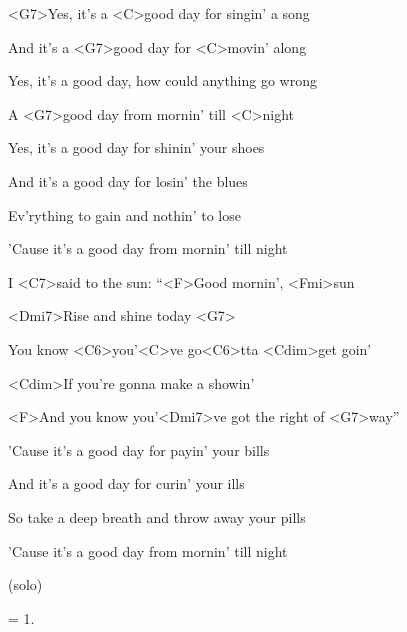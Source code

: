 
\zs
<G7>Yes, it's a <C>good day for singin' a song

And it's a <G7>good day for <C>movin' along 

Yes, it's a good day, how could anything go wrong

A <G7>good day from mornin' till <C>night
\ks

\zs 
Yes, it's a good day for shinin' your shoes 

And it's a good day for losin' the blues 

Ev'rything to gain and nothin' to lose 

'Cause it's a good day from mornin' till night 
\ks

\zr
I <C7>said to the sun: ``<F>Good mornin', <Fmi>sun

<Dmi7>Rise and shine today <G7>

You know <C6>you'<C>ve go<C6>tta <Cdim>get goin' 

<Cdim>If you're gonna make a showin' 

<F>And you know you'<Dmi7>ve got the right of <G7>way''
\kr

\zs
'Cause it's a good day for payin' your bills 

And it's a good day for curin' your ills 

So take a deep breath and throw away your pills 

'Cause it's a good day from mornin' till night 
\ks

(solo)

\zr
\kr

\zs
= 1.
\ks

\kp
